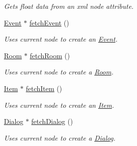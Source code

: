 \begin{DoxyCompactItemize}
\begin{DoxyCompactList}\small\item\em Gets float data from an xml node attribute. \item\end{DoxyCompactList}\item 
\hyperlink{classEvent}{Event} $\ast$ \hyperlink{classRRNode_a1739f49d6d61fcc9c025252569024fa9}{fetchEvent} ()
\begin{DoxyCompactList}\small\item\em Uses current node to create an \hyperlink{classEvent}{Event}. \item\end{DoxyCompactList}\item 
\hypertarget{classRRNode_a868525eff1317f6cb05821adab901b3f}{
\hyperlink{classRoom}{Room} $\ast$ \hyperlink{classRRNode_a868525eff1317f6cb05821adab901b3f}{fetchRoom} ()}
\label{classRRNode_a868525eff1317f6cb05821adab901b3f}

\begin{DoxyCompactList}\small\item\em Uses current node to create a \hyperlink{classRoom}{Room}. \item\end{DoxyCompactList}\item 
\hypertarget{classRRNode_ac92162703d370bbda24f3a2c851e4171}{
\hyperlink{classItem}{Item} $\ast$ \hyperlink{classRRNode_ac92162703d370bbda24f3a2c851e4171}{fetchItem} ()}
\label{classRRNode_ac92162703d370bbda24f3a2c851e4171}

\begin{DoxyCompactList}\small\item\em Uses current node to create an \hyperlink{classItem}{Item}. \item\end{DoxyCompactList}\item 
\hypertarget{classRRNode_a4f413ddb098dc6901467c44ec567ff36}{
\hyperlink{classDialog}{Dialog} $\ast$ \hyperlink{classRRNode_a4f413ddb098dc6901467c44ec567ff36}{fetchDialog} ()}
\label{classRRNode_a4f413ddb098dc6901467c44ec567ff36}

\begin{DoxyCompactList}\small\item\em Uses current node to create a \hyperlink{classDialog}{Dialog}. \item\end{DoxyCompactList}\end{DoxyCompactItemize}


